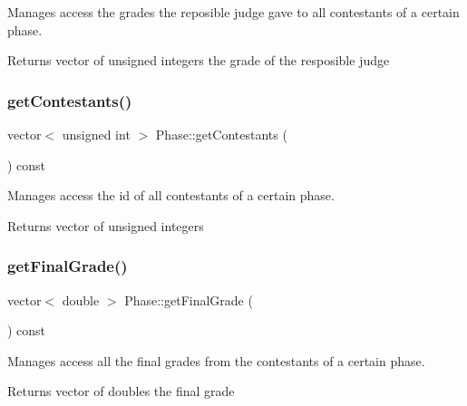 Manages access the grades the reposible judge gave to all contestants of a certain phase. 

\begin{DoxyReturn}{Returns}
vector of unsigned integers the grade of the resposible judge 
\end{DoxyReturn}
\mbox{\label{class_phase_a670856408ac3d956d30e371dd69fbf13}} 
\subsubsection{\texorpdfstring{get\+Contestants()}{getContestants()}}
{\footnotesize\ttfamily vector$<$ unsigned int $>$ Phase\+::get\+Contestants (\begin{DoxyParamCaption}{ }\end{DoxyParamCaption}) const}



Manages access the id of all contestants of a certain phase. 

\begin{DoxyReturn}{Returns}
vector of unsigned integers 
\end{DoxyReturn}
\mbox{\label{class_phase_acc55a56cbaec90a2972cb78ad8ce085c}} 
\subsubsection{\texorpdfstring{get\+Final\+Grade()}{getFinalGrade()}}
{\footnotesize\ttfamily vector$<$ double $>$ Phase\+::get\+Final\+Grade (\begin{DoxyParamCaption}{ }\end{DoxyParamCaption}) const}



Manages access all the final grades from the contestants of a certain phase. 

\begin{DoxyReturn}{Returns}
vector of doubles the final grade 
\end{DoxyReturn}
\mbox{\label{class_phase_aa705f5aa86b20627a115034ed9881246}} 
